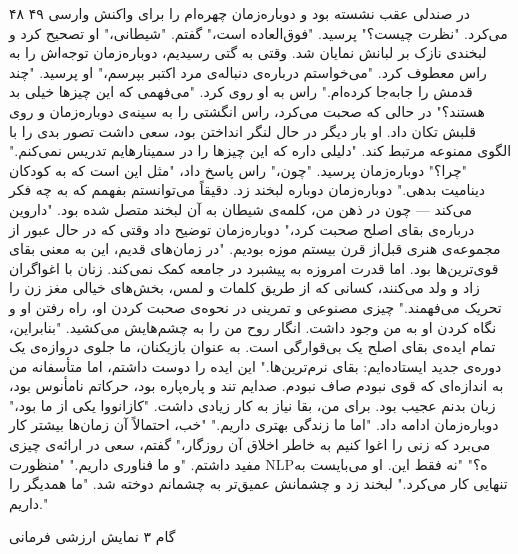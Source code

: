 ۴۸ ۴۹  
در صندلی عقب نشسته بود و دوباره‌زمان چهره‌ام را برای واکنش وارسی می‌کرد. "نظرت چیست؟" پرسید.  
"فوق‌العاده است،" گفتم.  
"شیطانی،" او تصحیح کرد و لبخندی نازک بر لبانش نمایان شد.  
وقتی به گتی رسیدیم، دوباره‌زمان توجه‌اش را به راس معطوف کرد. "می‌خواستم درباره‌ی دنباله‌ی مرد اکتبر بپرسم،" او پرسید. "چند قدمش را جابه‌جا کرده‌ام."  
راس به او روی کرد. "می‌فهمی که این چیزها خیلی بد هستند؟"  
در حالی که صحبت می‌کرد، راس انگشتی را به سینه‌ی دوباره‌زمان و روی قلبش تکان داد. او بار دیگر در حال لنگر انداختن بود، سعی داشت تصور بدی را با الگوی ممنوعه مرتبط کند. "دلیلی داره که این چیزها را در سمینارهایم تدریس نمی‌کنم."  
"چرا؟" دوباره‌زمان پرسید.  
"چون،" راس پاسخ داد، "مثل این است که به کودکان دینامیت بدهی."  
دوباره‌زمان دوباره لبخند زد. دقیقاً می‌توانستم بفهمم که به چه فکر می‌کند — چون در ذهن من، کلمه‌ی شیطان به آن لبخند متصل شده بود.  
"داروین درباره‌ی بقا‌ی اصلح صحبت کرد،" دوباره‌زمان توضیح داد وقتی که در حال عبور از مجموعه‌ی هنری قبل‌از قرن بیستم موزه بودیم. "در زمان‌های قدیم، این به معنی بقای قوی‌ترین‌ها بود. اما قدرت امروزه به پیشبرد در جامعه کمک نمی‌کند. زنان با اغواگران زاد و ولد می‌کنند، کسانی که از طریق کلمات و لمس، بخش‌های خیالی مغز زن را تحریک می‌فهمند."  
چیزی مصنوعی و تمرینی در نحوه‌ی صحبت کردن او، راه رفتن او و نگاه کردن او به من وجود داشت. انگار روح من را به چشم‌هایش می‌کشید. "بنابراین، تمام ایده‌ی بقا‌ی اصلح یک بی‌قوارگی است. به عنوان بازیکنان، ما جلوی دروازه‌ی یک دوره‌ی جدید ایستاده‌ایم: بقا‌ی نرم‌ترین‌ها."  
این ایده را دوست داشتم، اما متأسفانه من به اندازه‌ای که قوی نبودم صاف نبودم. صدایم تند و پاره‌پاره بود، حرکاتم نامأنوس بود، زبان بدنم عجیب بود. برای من، بقا نیاز به کار زیادی داشت.  
"کازانووا یکی از ما بود،" دوباره‌زمان ادامه داد. "اما ما زندگی بهتری داریم."  
"خب، احتمالاً آن زمان‌ها بیشتر کار می‌برد که زنی را اغوا کنیم به خاطر اخلاق آن روزگار،" گفتم، سعی در ارائه‌ی چیزی مفید داشتم.  
"و ما فناوری داریم."  
"منظورت NLPه؟"  
"نه فقط این. او می‌بایست به تنهایی کار می‌کرد." لبخند زد و چشمانش عمیق‌تر به چشمانم دوخته شد. "ما همدیگر را داریم."

گام ۳  
نمایش ارزشی فرمانی